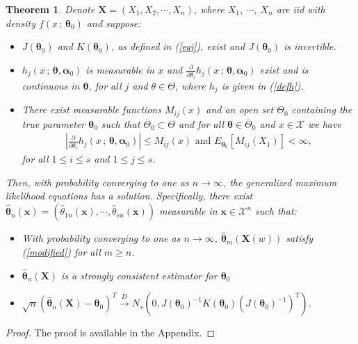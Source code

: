 \documentclass[10pt,a4paper,onecolumn]{article} %
\newtheorem{theorem}{Theorem}[section]
\newcommand{\bs}{\boldsymbol}
\begin{document}
\begin{theorem}\label{coprinc} Denote $\bs{X}=\left(X_1, X_2, \cdots, X_n\right)$, where $X_1$, $\cdots$, $X_n$ are iid with density $f(x\,;\,\bs{\theta}_0)$ and suppose:
\begin{itemize}

\item[(A)]  $J(\bs{\theta}_0)$ and $K(\bs{\theta}_0)$, as defined in (\ref{eqj}), exist and $J(\bs{\theta}_0)$ is invertible.
\item[(B)] $h_j(x\, ;\, \bs{\theta},\bs{\alpha}_0)$ is measurable in $x$ and $\frac{\partial}{\partial \theta_i}h_j(x\, ;\, \bs{\theta},\bs{\alpha}_0)$ exist and is continuous in $\bs{\theta}$, for all $j$ and $\theta\in \Theta$, where $h_j$ is given in (\ref{defh}).
\item[(C)] There exist measurable functions $M_{ij}(x)$ and an open set $\Theta_0$ containing the true parameter $\bs{\theta}_0$ such that $\overline{\Theta}_0\subset \Theta$ and for all $\bs{\theta}\in \overline{\Theta}_0$ and $x\in \mathcal{X}$ we have
\begin{equation*}
 \begin{aligned}
 \left|\frac{\partial}{\partial\theta_i} h_j(x\, ;\, \bs{\theta},\bs{\alpha}_0)\right|\leq M_{ij}(x)\mbox{ and }E_{\bs{\theta}_0}\left[M_{ij}(X_1)\right]<\infty,
 \end{aligned}
 \end{equation*}
for all $1\leq i\leq s$ and $1\leq j\leq s$.
\end{itemize}
Then, with probability converging to one as $n\to \infty$, the generalized maximum likelihood equations has a solution. Specifically, there exist  $\bs{\hat{\theta}}_n(\bs{x})=(\hat{\theta}_{1n}(\bs{x}),\cdots,\hat{\theta}_{sn}(\bs{x}))$ measurable in $\bs{x}\in \mathcal{X}^n$ such that:
\begin{itemize}
\item[I)] With probability converging to one as $n\to \infty$, $\bs{\hat{\theta}}_m(\bs{X}(w))$ satisfy (\ref{modified}) for all $m\geq n$.
\item[II)] $\bs{\hat{\theta}}_n(\bs{X})$ is a strongly consistent estimator for $\bs{\theta}_0$
\item[III)]
$\sqrt{n}(\bs{\hat{\theta}}_n(\bs{X})-\bs{\theta}_0)^T\overset{D}{\to} N_s\left(0,J(\bs{\theta}_0)^{-1} K(\bs{\theta}_0)(J(\bs{\theta}_0)^{-1})^T\right)$.
\end{itemize}
\end{theorem}

\begin{proof} The proof is available in the Appendix.
 \end{proof}
\end{document}

